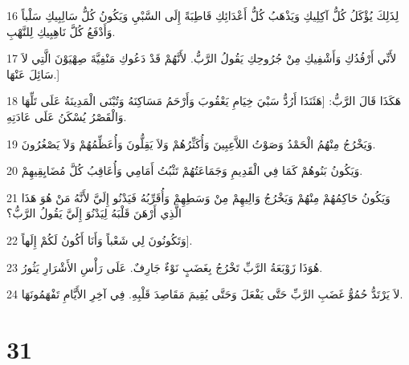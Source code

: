 \par 16 لِذَلِكَ يُؤْكَلُ كُلُّ آكِلِيكِ وَيَذْهَبُ كُلُّ أَعْدَائِكِ قَاطِبَةً إِلَى السَّبْيِ وَيَكُونُ كُلُّ سَالِبِيكِ سَلْباً وَأَدْفَعُ كُلَّ نَاهِبِيكِ لِلنَّهْبِ.
\par 17 لأَنِّي أَرْفُدُكِ وَأَشْفِيكِ مِنْ جُرُوحِكِ يَقُولُ الرَّبُّ. لأَنَّهُمْ قَدْ دَعُوكِ مَنْفِيَّةَ صِهْيَوْنَ الَّتِي لاَ سَائِلَ عَنْهَا.]
\par 18 هَكَذَا قَالَ الرَّبُّ: [هَئَنَذَا أَرُدُّ سَبْيَ خِيَامِ يَعْقُوبَ وَأَرْحَمُ مَسَاكِنَهُ وَتُبْنَى الْمَدِينَةُ عَلَى تَلِّهَا وَالْقَصْرُ يُسْكَنُ عَلَى عَادَتِهِ.
\par 19 وَيَخْرُجُ مِنْهُمُ الْحَمْدُ وَصَوْتُ اللاَّعِبِينَ وَأُكَثِّرُهُمْ وَلاَ يَقِلُّونَ وَأُعَظِّمُهُمْ وَلاَ يَصْغُرُونَ.
\par 20 وَيَكُونُ بَنُوهُمْ كَمَا فِي الْقَدِيمِ وَجَمَاعَتُهُمْ تَثْبُتُ أَمَامِي وَأُعَاقِبُ كُلَّ مُضَايِقِيهِمْ.
\par 21 وَيَكُونُ حَاكِمُهُمْ مِنْهُمْ وَيَخْرُجُ وَالِيهِمْ مِنْ وَسَطِهِمْ وَأُقَرِّبُهُ فَيَدْنُو إِلَيَّ لأَنَّهُ مَنْ هُوَ هَذَا الَّذِي أَرْهَنَ قَلْبَهُ لِيَدْنُوَ إِلَيَّ يَقُولُ الرَّبُّ؟
\par 22 وَتَكُونُونَ لِي شَعْباً وَأَنَا أَكُونُ لَكُمْ إِلَهاً].
\par 23 هُوَذَا زَوْبَعَةُ الرَّبِّ تَخْرُجُ بِغَضَبٍ نَوْءٌ جَارِفٌ. عَلَى رَأْسِ الأَشْرَارِ يَثُورُ.
\par 24 لاَ يَرْتَدُّ حُمُوُّ غَضَبِ الرَّبِّ حَتَّى يَفْعَلَ وَحَتَّى يُقِيمَ مَقَاصِدَ قَلْبِهِ. فِي آخِرِ الأَيَّامِ تَفْهَمُونَهَا.

\chapter{31}

